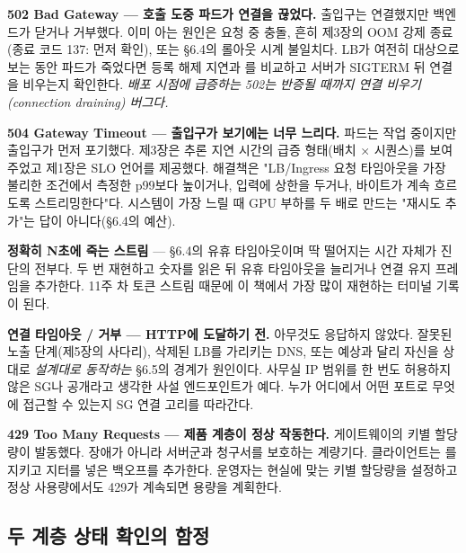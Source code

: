 \begin{tbbitemize}
  \item \textbf{502 Bad Gateway — 호출 도중 파드가 연결을 끊었다.} 출입구는 연결했지만 백엔드가 닫거나 거부했다. 이미 아는 원인은 요청 중 충돌, 흔히 제3장의 OOM 강제 종료(종료 코드 137: 먼저  확인), 또는 §6.4의 롤아웃 시계 불일치다. LB가 여전히 대상으로 보는 동안 파드가 죽었다면 등록 해제 지연과 를 비교하고 서버가 SIGTERM 뒤 연결을 비우는지 확인한다. \textit{배포 시점에 급증하는 502는 반증될 때까지 연결 비우기(connection draining) 버그다.}
  \item \textbf{504 Gateway Timeout — 출입구가 보기에는 너무 느리다.} 파드는 작업 중이지만 출입구가 먼저 포기했다. 제3장은 추론 지연 시간의 급증 형태(배치 × 시퀀스)를 보여 주었고 제1장은 SLO 언어를 제공했다. 해결책은 "LB/Ingress 요청 타임아웃을 가장 불리한 조건에서 측정한 p99보다 높이거나, 입력에 상한을 두거나, 바이트가 계속 흐르도록 스트리밍한다"다. 시스템이 가장 느릴 때 GPU 부하를 두 배로 만드는 "재시도 추가"는 답이 아니다(§6.4의 예산).
  \item \textbf{정확히 N초에 죽는 스트림} — §6.4의 유휴 타임아웃이며 딱 떨어지는 시간 자체가 진단의 전부다. 두 번 재현하고 숫자를 읽은 뒤 유휴 타임아웃을 늘리거나 연결 유지 프레임을 추가한다. 11주 차 토큰 스트림 때문에 이 책에서 가장 많이 재현하는 터미널 기록이 된다.
  \item \textbf{연결 타임아웃 / 거부 — HTTP에 도달하기 전.} 아무것도 응답하지 않았다. 잘못된 노출 단계(제5장의 사다리), 삭제된 LB를 가리키는 DNS, 또는 예상과 달리 자신을 상대로 \textit{설계대로 동작하는} §6.5의 경계가 원인이다. 사무실 IP 범위를 한 번도 허용하지 않은 SG나 공개라고 생각한 사설 엔드포인트가 예다. 누가 어디에서 어떤 포트로 무엇에 접근할 수 있는지 SG 연결 고리를 따라간다.
  \item \textbf{429 Too Many Requests — 제품 계층이 정상 작동한다.} 게이트웨이의 키별 할당량이 발동했다. 장애가 아니라 서버군과 청구서를 보호하는 계량기다. 클라이언트는 를 지키고 지터를 넣은 백오프를 추가한다. 운영자는 현실에 맞는 키별 할당량을 설정하고 정상 사용량에서도 429가 계속되면 용량을 계획한다.
\end{tbbitemize}

\subsection*{두 계층 상태 확인의 함정}

